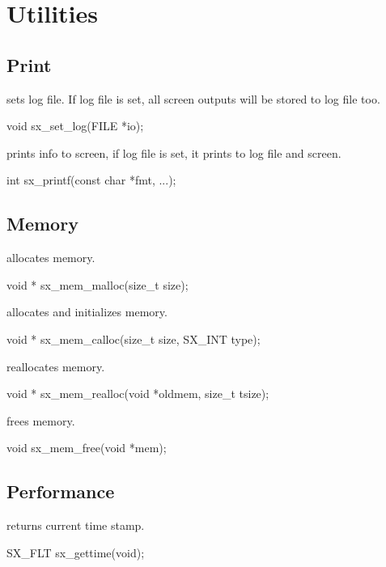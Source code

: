 \chapter{Utilities}

\section{Print}

 sets log file. If log file is set, all screen outputs will be stored to log file too.
\begin{evb}
void sx_set_log(FILE *io);
\end{evb}

 prints info to screen, if log file is set, it prints to log file and screen.
\begin{evb}
int sx_printf(const char *fmt, ...);
\end{evb}

\section{Memory}

 allocates memory.
\begin{evb}
void * sx_mem_malloc(size_t size);
\end{evb}

 allocates and initializes memory.
\begin{evb}
void * sx_mem_calloc(size_t size, SX_INT type);
\end{evb}

 reallocates memory.
\begin{evb}
void * sx_mem_realloc(void *oldmem, size_t tsize);
\end{evb}

 frees memory.
\begin{evb}
void sx_mem_free(void *mem);
\end{evb}

\section{Performance}

 returns current time stamp.
\begin{evb}
SX_FLT sx_gettime(void);
\end{evb}
